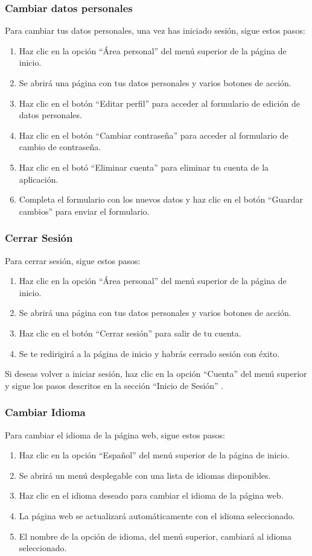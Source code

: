 \subsubsection{Cambiar datos personales}
Para cambiar tus datos personales, una vez has iniciado sesión, sigue estos pasos:
\begin{enumerate}
	\item Haz clic en la opción “Área personal” del menú superior de la página de inicio.
	\item Se abrirá una página con tus datos personales y varios botones de acción.
	\item Haz clic en el botón “Editar perfil” para acceder al formulario de edición de datos personales.
	\item Haz clic en el botón “Cambiar contraseña” para acceder al formulario de cambio de contraseña.
	\item Haz clic en el botó “Eliminar cuenta” para eliminar tu cuenta de la aplicación.
	\item Completa el formulario con los nuevos datos y haz clic en el botón “Guardar cambios” para enviar el formulario.
\end{enumerate}

\subsubsection{Cerrar Sesión}
Para cerrar sesión, sigue estos pasos:
\begin{enumerate}
	\item Haz clic en la opción “Área personal” del menú superior de la página de inicio.
	\item Se abrirá una página con tus datos personales y varios botones de acción.
	\item Haz clic en el botón “Cerrar sesión” para salir de tu cuenta.
	\item Se te redirigirá a la página de inicio y habrás cerrado sesión con éxito.
\end{enumerate}
Si deseas volver a iniciar sesión, haz clic en la opción “Cuenta” del menú superior y sigue los pasos descritos en la sección “Inicio de Sesión” .

\subsubsection{Cambiar Idioma}
Para cambiar el idioma de la página web, sigue estos pasos:
\begin{enumerate}
	\item Haz clic en la opción “Español” del menú superior de la página de inicio.
	\item Se abrirá un menú desplegable con una lista de idiomas disponibles.
	\item Haz clic en el idioma deseado para cambiar el idioma de la página web.
	\item La página web se actualizará automáticamente con el idioma seleccionado.
	\item El nombre de la opción de idioma, del menú superior, cambiará al idioma seleccionado.
\end{enumerate}

